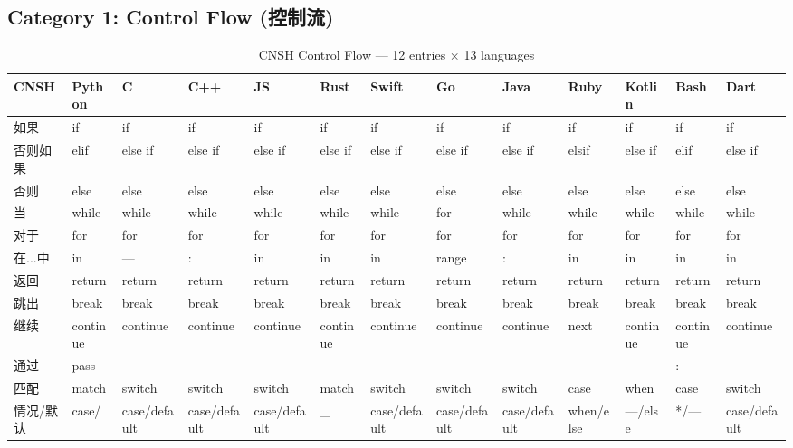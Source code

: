 \subsection{Category 1: Control Flow (控制流)}
\label{app:ren-control}

\begin{table}[h]
\centering
\caption{CNSH Control Flow — 12 entries × 13 languages}
\renewcommand{\arraystretch}{1.2}
\fontsize{8}{10}\selectfont
\begin{tabular}{lllllllllllll}
\toprule
\textbf{CNSH} & \textbf{Python} & \textbf{C} & \textbf{C++} & \textbf{JS} & \textbf{Rust} & \textbf{Swift} & \textbf{Go} & \textbf{Java} & \textbf{Ruby} & \textbf{Kotlin} & \textbf{Bash} & \textbf{Dart} \\
\midrule
如果 & if & if & if & if & if & if & if & if & if & if & if & if \\
否则如果 & elif & else if & else if & else if & else if & else if & else if & else if & elsif & else if & elif & else if \\
否则 & else & else & else & else & else & else & else & else & else & else & else & else \\
当 & while & while & while & while & while & while & for & while & while & while & while & while \\
对于 & for & for & for & for & for & for & for & for & for & for & for & for \\
在...中 & in & — & : & in & in & in & range & : & in & in & in & in \\
返回 & return & return & return & return & return & return & return & return & return & return & return & return \\
跳出 & break & break & break & break & break & break & break & break & break & break & break & break \\
继续 & continue & continue & continue & continue & continue & continue & continue & continue & next & continue & continue & continue \\
通过 & pass & — & — & — & — & — & — & — & — & — & : & — \\
匹配 & match & switch & switch & switch & match & switch & switch & switch & case & when & case & switch \\
情况/默认 & case/\_ & case/default & case/default & case/default & \_ & case/default & case/default & case/default & when/else & —/else & */— & case/default \\
\bottomrule
\end{tabular}
\end{table}

